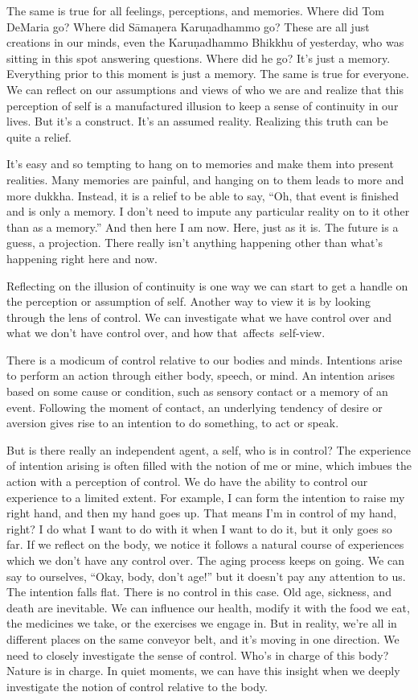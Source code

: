 The same is true for all feelings, perceptions, and memories. Where did Tom DeMaria go? Where did Sāmaṇera Karuṇadhammo go? These are all just creations in our minds, even the Karuṇadhammo Bhikkhu of yesterday, who was sitting in this spot answering questions. Where did he go? It's just a memory. Everything prior to this moment is just a memory. The same is true for everyone. We can reflect on our assumptions and views of who we are and realize that this perception of self is a manufactured illusion to keep a sense of continuity in our lives. But it's a construct. It's an assumed reality. Realizing this truth can be quite a relief.

It's easy and so tempting to hang on to memories and make them into present realities. Many memories are painful, and hanging on to them leads to more and more dukkha. Instead, it is a relief to be able to say, ``Oh, that event is finished and is only a memory. I don't need to impute any particular reality on to it other than as a memory.'' And then here I am now. Here, just as it is. The future is a guess, a projection. There really isn't anything happening other than what's happening right here and now.

Reflecting on the illusion of continuity is one way we can start to get a handle on the perception or assumption of self. Another way to view it is by looking through the lens of control. We can investigate what we have control over and what we don't have control over, and how \mbox{that affects self-view.}

There is a modicum of control relative to our bodies and minds. Intentions arise to perform an action through either body, speech, or mind. An intention arises based on some cause or condition, such as sensory contact or a memory of an event. Following the moment of contact, an underlying tendency of desire or aversion gives rise to an intention to do something, to act or speak.

But is there really an independent agent, a self, who is in control? The experience of intention arising is often filled with the notion of me or mine, which imbues the action with a perception of control. We do have the ability to control our experience to a limited extent. For example, I can form the intention to raise my right hand, and then my hand goes up. That means I'm in control of my hand, right? I do what I want to do with it when I want to do it, but it only goes so far. If we reflect on the body, we notice it follows a natural course of experiences which we don't have any control over. The aging process keeps on going. We can say to ourselves, ``Okay, body, don't age!'' but it doesn't pay any attention to us. The intention falls flat. There is no control in this case. Old age, sickness, and death are inevitable. We can influence our health, modify it with the food we eat, the medicines we take, or the exercises we engage in. But in reality, we're all in different places on the same conveyor belt, and it's moving in one direction. We need to closely investigate the sense of control. Who's in charge of this body? Nature is in charge. In quiet moments, we can have this insight when we deeply investigate the notion of control relative to the body.

